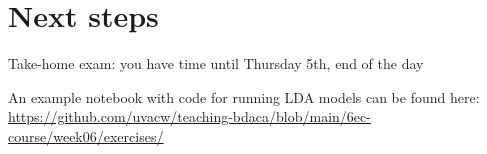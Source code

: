 \documentclass[compress]{beamer}
\begin{document}





\section{Next steps}

\begin{frame}[standout]
Take-home exam: you have time until Thursday 5th, end of the day

An example notebook with code for running LDA models can be found here:
\large{\url{https://github.com/uvacw/teaching-bdaca/blob/main/6ec-course/week06/exercises/}}
\end{frame}



\begin{frame}
	\printbibliography
\end{frame}
\end{document}
